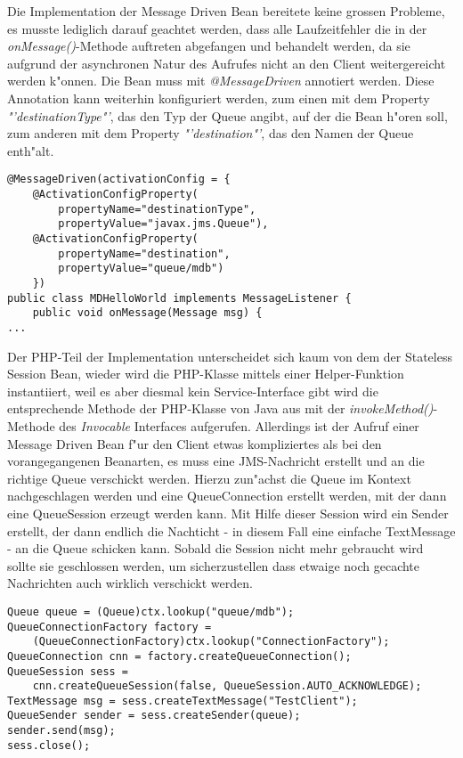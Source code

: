 Die Implementation der Message Driven Bean bereitete keine grossen Probleme, es musste lediglich
darauf geachtet werden, dass alle Laufzeitfehler die in der \emph{onMessage()}-Methode auftreten
abgefangen und behandelt werden, da sie aufgrund der asynchronen Natur des Aufrufes nicht an den 
Client weitergereicht werden k"onnen. Die Bean muss mit \emph{@MessageDriven} annotiert werden.
Diese Annotation kann weiterhin konfiguriert werden, zum einen mit dem Property \emph{"'destinationType"'}, 
das den Typ der Queue angibt, auf der die Bean h"oren soll, zum anderen mit dem Property \emph{"'destination"'},
das den Namen der Queue enth"alt.
\begin{lstlisting}[caption=Konfiguration der Message Driven Bean]
@MessageDriven(activationConfig = {
    @ActivationConfigProperty(
        propertyName="destinationType", 
        propertyValue="javax.jms.Queue"),
    @ActivationConfigProperty(
        propertyName="destination", 
        propertyValue="queue/mdb")
    })
public class MDHelloWorld implements MessageListener {
    public void onMessage(Message msg) {
...
\end{lstlisting}
Der PHP-Teil der Implementation unterscheidet sich kaum von dem der Stateless Session Bean, wieder wird
die PHP-Klasse mittels einer Helper-Funktion instantiiert, weil es aber diesmal kein Service-Interface gibt
wird die entsprechende Methode der PHP-Klasse von Java aus mit der \emph{invokeMethod()}-Methode des
\emph{Invocable} Interfaces aufgerufen.
Allerdings ist der Aufruf einer Message Driven Bean f"ur den Client etwas kompliziertes als bei den
vorangegangenen Beanarten, es muss eine JMS-Nachricht erstellt und an die richtige Queue verschickt werden.
Hierzu zun"achst die Queue im Kontext nachgeschlagen werden und eine QueueConnection erstellt werden, mit der
dann eine QueueSession erzeugt werden kann. Mit Hilfe dieser Session wird ein Sender erstellt, der dann
endlich die Nachticht - in diesem Fall eine einfache TextMessage - an die Queue schicken kann. Sobald die Session
nicht mehr gebraucht wird sollte sie geschlossen werden, um sicherzustellen dass etwaige noch gecachte Nachrichten
auch wirklich verschickt werden.
\begin{lstlisting}[caption=Senden einer JMS-Nachricht]
Queue queue = (Queue)ctx.lookup("queue/mdb");
QueueConnectionFactory factory = 
    (QueueConnectionFactory)ctx.lookup("ConnectionFactory");
QueueConnection cnn = factory.createQueueConnection();
QueueSession sess = 
    cnn.createQueueSession(false, QueueSession.AUTO_ACKNOWLEDGE);
TextMessage msg = sess.createTextMessage("TestClient");
QueueSender sender = sess.createSender(queue);
sender.send(msg);
sess.close();
\end{lstlisting}


